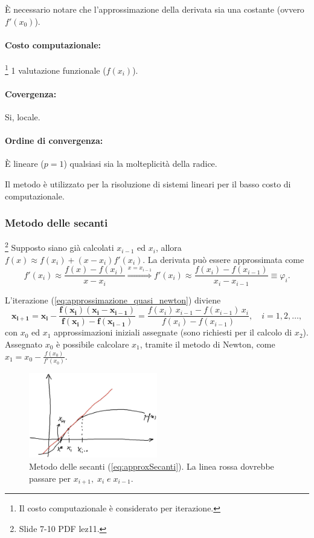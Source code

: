È necessario notare che l'approssimazione della derivata sia una costante (ovvero $f'(x_0)$).

\paragraph{Costo computazionale:}\footnote{Il costo computazionale è considerato per iterazione.} 1 valutazione funzionale ($f(x_i)$).
\paragraph{Covergenza:}Si, locale.
\paragraph{Ordine di convergenza:} È lineare ($p = 1$) qualsiasi sia la molteplicità della radice.

Il metodo è utilizzato per la risoluzione di sistemi lineari per il basso costo di computazionale.

\subsubsection{Metodo delle secanti}\label{sssec:metodo_secanti}
\footnote{Slide 7-10 PDF lez11.}
Supposto siano già calcolati $x_{i-1}$ ed $x_i$, allora $f(x)\approx f(x_i)+(x-x_i)f'(x_i)$. La derivata può essere approssimata come 
\begin{equation*}
	f'(x_i)\approx\frac{f(x)-f(x_{i})}{x-x_i}\overset{x=x_{i-1}}{\Longrightarrow}f'(x_i)\approx\frac{f(x_i)-f(x_{i-1})}{x_i-x_{i-1}}\equiv\varphi_i.
\end{equation*}

L'iterazione (\ref{eq:approssimazione_quasi_newton}) diviene
\begin{equation}\label{eq:approxSecanti}
	\boldsymbol{x_{i+1}=x_i-\frac{f(x_i)(x_i-x_{i-1})}{f(x_i)-f(x_{i-1})}}=\frac{f(x_i)\,x_{i-1} - f(x_{i-1})\,x_i}{f(x_i)-f(x_{i-1})}, \quad i=1,2,\hdots,
\end{equation}
con $x_0$ ed $x_1$ approssimazioni iniziali assegnate (sono richiesti per il calcolo di $x_2$). Assegnato $x_0$ è possibile calcolare $x_1$, tramite il metodo di Newton, come $x_1=x_0-\frac{f(x_0)}{f'(x_0)}$.

\begin{figure}
	\centering
	\includegraphics[width=0.5\textwidth]{immagini/GraficoSecanti.png}
	\caption{\label{fig:GraficoSecanti} Metodo delle secanti (\ref{eq:approxSecanti}). La linea rossa dovrebbe passare per $x_{i+1},\; x_i\; e\; x_{i-1}$.}
\end{figure}

